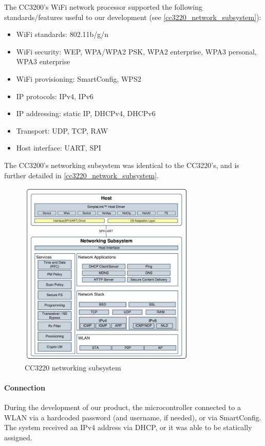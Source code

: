 The CC3200's WiFi network processor supported the following standards/features useful to our development
(see \autoref{cc3220_network_subsystem}):
\begin{itemize}
    \item WiFi standards: 802.11b/g/n
    \item WiFi security: WEP, WPA/WPA2 PSK, WPA2 enterprise, WPA3 personal,
    WPA3 enterprise
    \item WiFi provisioning: SmartConfig, WPS2
    \item IP protocols: IPv4, IPv6
    \item IP addressing: static IP, DHCPv4, DHCPv6
    \item Transport: UDP, TCP, RAW
    \item Host interface: UART, SPI
\end{itemize}
The CC3200's networking subsystem was identical to the CC3220's, and is further detailed in \autoref{cc3220_network_subsystem}.
\begin{figure}[H]
    \caption{CC3220 networking subsystem \cite{swru455m}}
    \label{cc3220_network_subsystem}
    \centering
    \includegraphics[width=0.75\textwidth]{images/cc3220_network_subsystem.png}
\end{figure}
\paragraph{Connection}
During the development of our product, the microcontroller connected to a WLAN via a hardcoded password (and username, if needed), or via SmartConfig. The system received an IPv4 address via DHCP, or it was able to be statically assigned.

